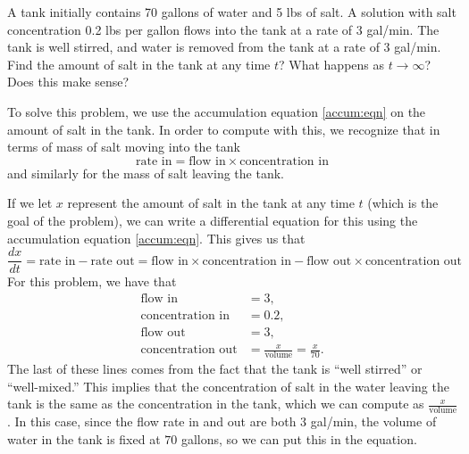 \begin{example}
A tank initially contains 70 gallons of water and 5 lbs of salt. A solution with salt concentration 0.2 lbs per gallon flows into the tank at a rate of $3$ gal/min. The tank is well stirred, and water is removed from the tank at a rate of $3$ gal/min. Find the amount of salt in the tank at any time $t$? What happens as $t\rightarrow \infty$? Does this make sense?
\end{example}

\begin{exampleSol}
To solve this problem, we use the accumulation equation \eqref{accum:eqn} on the amount of salt in the tank. In order to compute with this, we recognize that in terms of mass of salt moving into the tank
\begin{equation*}
\text{rate in} = \text{flow in} \times \text{concentration in}
\end{equation*}
and similarly for the mass of salt leaving the tank. 

If we let $x$ represent the amount of salt in the tank at any time $t$ (which is the goal of the problem), we can write a differential equation for this using the accumulation equation \eqref{accum:eqn}. This gives us that
\begin{equation*}
\frac{dx}{dt} = \text{rate in} - \text{rate out} = \text{flow in} \times \text{concentration in} - \text{flow out} \times \text{concentration out}
\end{equation*}
For this problem, we have that
\begin{align*}
\text{flow in} &= 3 , \\
\text{concentration in} &= 0.2 , \\
\text{flow out} &= 3 , \\
\text{concentration out} &= \frac{x}{\text{volume}} = \frac{x}{70}.
\end{align*}
The last of these lines comes from the fact that the tank is ``well stirred'' or ``well-mixed.'' This implies that the concentration of salt in the water leaving the tank is the same as the concentration in the tank, which we can compute as $\frac{x}{\text{volume}}$. In this case, since the flow rate in and out are both 3 gal/min, the volume of water in the tank is fixed at $70$ gallons, so we can put this in the equation. 


\end{exampleSol}
